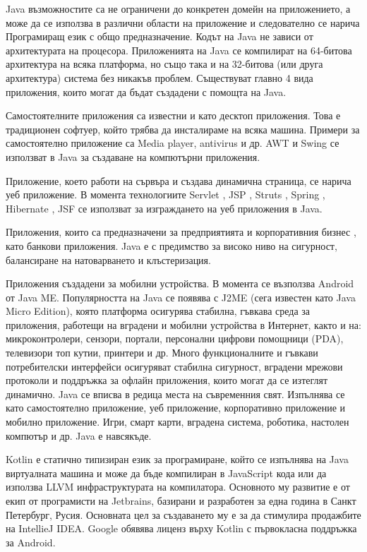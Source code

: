 Java възможностите са не ограничени до конкретен домейн на приложението, а може да се използва в различни области на приложение и следователно се нарича Програмиращ език с общо предназначение. Кодът на Java не зависи от архитектурата на процесора. Приложенията на Java се компилират на 64-битова архитектура на всяка платформа, но също така и на 32-битова (или друга архитектура) система без никакъв проблем. Съществуват главно 4 вида приложения, които могат да бъдат създадени с помощта на Java. 

Самостоятелните приложения са известни и като десктоп приложения. Това е традиционен софтуер, който трябва да инсталираме на всяка машина. Примери за самостоятелно приложение са Media player, antivirus и др. AWT и Swing се използват в Java за създаване на компютърни приложения. 

Приложение, което работи на сървъра и създава динамична страница, се нарича уеб приложение. В момента технологиите Servlet , JSP , Struts , Spring , Hibernate , JSF се използват за изграждането на уеб приложения в Java.

Приложения, които са предназначени за предприятията и корпоративния бизнес , като банкови приложения. Java е с предимство за високо ниво на сигурност, балансиране на натоварването и клъстеризация. 

Приложения създадени за мобилни устройства. В момента се възползва Android от Java ME. Популярността на Java се появява с J2ME (сега известен като Java Micro Edition), която платформа  осигурява стабилна, гъвкава среда за приложения, работещи на вградени и мобилни устройства в Интернет, както и на: микроконтролери, сензори, портали, персонални цифрови помощници (PDA), телевизори топ кутии, принтери и др. Много функционалните и гъвкави потребителски интерфейси осигуряват стабилна сигурност, вградени мрежови протоколи и поддръжка за  офлайн приложения, които могат да се изтеглят динамично. Java се вписва в редица места на съвременния свят. Изпълнява се като самостоятелно приложение, уеб приложение, корпоративно приложение и мобилно приложение. Игри, смарт карти, вградена система, роботика, настолен компютър и др. Java е навсякъде.

Kotlin е статично типизиран език за програмиране, който се изпълнява на Java виртуалната машина и може да бъде компилиран в JavaScript кода или да използва LLVM инфраструктурата на компилатора. Основното му развитие е от екип от програмисти на Jetbrains, базирани и разработен за една година в Санкт Петербург, Русия. Основната цел за създаването му е за да стимулира продажбите на IntellieJ IDEA. Google обявява лиценз върху Kotlin с първокласна поддръжка за Android.

